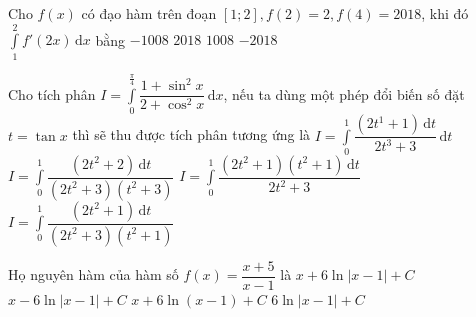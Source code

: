 \begin{ex}%
Cho $f(x)$ có đạo hàm trên đoạn $[1; 2], f(2)=2, f(4)=2018$, khi đó $\displaystyle\int\limits_1^2 f'(2x)\mathrm{\,d}x$ bằng
\choice
{$-1008$}
{$2018$}
{\True $1008$}
{$-2018$}
\end{ex}

\begin{ex}%
Cho tích phân $I=\displaystyle\int\limits_0^{\frac{\pi}{4}} \dfrac{1+\sin^2x}{2+\cos^2x} \mathrm{\,d}x$, nếu ta dùng một phép đổi biến số đặt $t=\tan x$ thì sẽ thu được tích phân tương ứng là
\choice
{$I=\displaystyle\int\limits_0^1 \dfrac{(2t^1+1)\mathrm{\,d}t}{2t^3+3}\mathrm{\,d}t$}
{$I=\displaystyle\int\limits_0^1 \dfrac{(2t^2+2)\mathrm{\,d}t}{(2t^2+3)(t^2+3)}$}
{$I=\displaystyle\int\limits_0^1 \dfrac{(2t^2+1)(t^2+1)\mathrm{\,d}t}{2t^2+3}$}
{\True $I=\displaystyle\int\limits_0^1 \dfrac{(2t^2+1)\mathrm{\,d}t}{(2t^2+3)(t^2+1)}$}
\end{ex}

\begin{ex}%
Họ nguyên hàm của hàm số $ f(x)=\dfrac{x+5}{x-1} $ là
\choice
{\True $ x+6\ln \vert x-1 \vert +C$}
{$ x-6\ln \vert x-1 \vert +C$}
{$ x+6\ln ( x-1) +C$}
{$ 6\ln \vert x-1 \vert +C$}
\end{ex}

